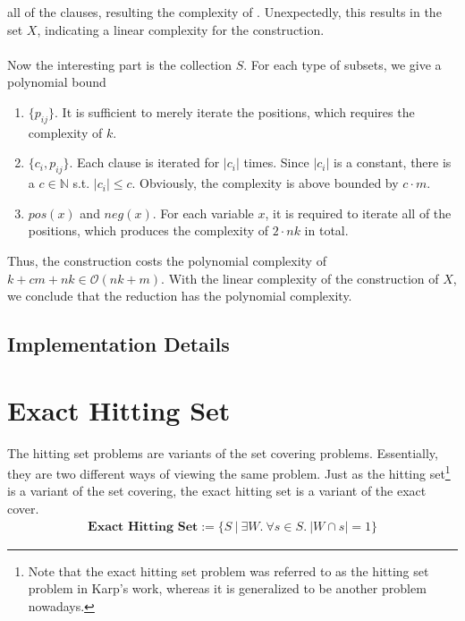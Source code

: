 all of the clauses, resulting the complexity of . Unexpectedly, this results in the set $X$, 
indicating a linear complexity for the construction. \\\\
Now the interesting part is the collection $S$. For each type of subsets, we give a polynomial bound 
\begin{enumerate}
    \item $\{p_{ij}\}$. It is sufficient to merely iterate the positions, which requires the complexity of $k$.
    \item $\{c_i, p_{ij}\}$. Each clause is iterated for $|c_i|$ times. Since $|c_i|$ is a constant, there is a $c \in \mathbb{N}$ 
    s.t. $|c_i| \leq c$. Obviously, the complexity is above bounded by $c \cdot m$.
    \item $pos(x)$ and $neg(x)$. For each variable $x$, it is required to iterate all of the positions, which produces the complexity 
    of $2 \cdot nk$ in total.
\end{enumerate}
Thus, the construction costs the polynomial complexity of $k + cm + nk \in \mathcal{O}(nk + m)$. 
With the linear complexity of the construction of $X$, we conclude that the reduction has the polynomial complexity.

\subsection{Implementation Details}
\label{sec:sat-imp}


\section{Exact Hitting Set}
The hitting set problems are variants of the set covering problems. Essentially, they are two different ways 
of viewing the same problem. Just as the hitting set\footnote{Note that the exact hitting set problem was referred to as the hitting set problem in Karp's work, whereas 
it is generalized to be another problem nowadays.} is a variant of the set covering, the exact hitting set is 
a variant of the exact cover. 
\begin{align*}
   \textbf{Exact Hitting Set} := \{S\ |\ \exists W.\ \forall s \in S.\ |W \cap s| = 1\}
\end{align*}
 

